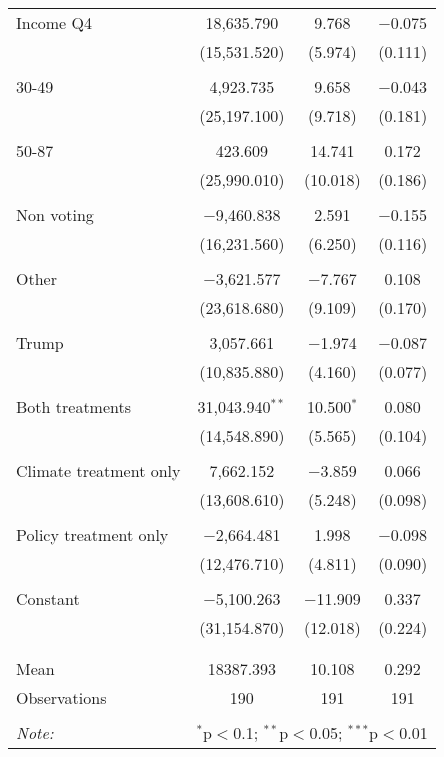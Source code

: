 \begin{tabular}{@{\extracolsep{5pt}}lccc}
 Income Q4 & 18,635.790 & 9.768 & $-$0.075 \\ 
  & (15,531.520) & (5.974) & (0.111) \\ 
  & & & \\ 
 30-49 & 4,923.735 & 9.658 & $-$0.043 \\ 
  & (25,197.100) & (9.718) & (0.181) \\ 
  & & & \\ 
 50-87 & 423.609 & 14.741 & 0.172 \\ 
  & (25,990.010) & (10.018) & (0.186) \\ 
  & & & \\ 
 Non voting & $-$9,460.838 & 2.591 & $-$0.155 \\ 
  & (16,231.560) & (6.250) & (0.116) \\ 
  & & & \\ 
 Other & $-$3,621.577 & $-$7.767 & 0.108 \\ 
  & (23,618.680) & (9.109) & (0.170) \\ 
  & & & \\ 
 Trump & 3,057.661 & $-$1.974 & $-$0.087 \\ 
  & (10,835.880) & (4.160) & (0.077) \\ 
  & & & \\ 
 Both treatments & 31,043.940$^{**}$ & 10.500$^{*}$ & 0.080 \\ 
  & (14,548.890) & (5.565) & (0.104) \\ 
  & & & \\ 
 Climate treatment only & 7,662.152 & $-$3.859 & 0.066 \\ 
  & (13,608.610) & (5.248) & (0.098) \\ 
  & & & \\ 
 Policy treatment only & $-$2,664.481 & 1.998 & $-$0.098 \\ 
  & (12,476.710) & (4.811) & (0.090) \\ 
  & & & \\ 
 Constant & $-$5,100.263 & $-$11.909 & 0.337 \\ 
  & (31,154.870) & (12.018) & (0.224) \\ 
  & & & \\ 
\hline \\[-1.8ex] 
Mean & 18387.393 & 10.108 & 0.292 \\ 
Observations & 190 & 191 & 191 \\ 
\hline 
\hline \\[-1.8ex] 
\textit{Note:}  & \multicolumn{3}{r}{$^{*}$p$<$0.1; $^{**}$p$<$0.05; $^{***}$p$<$0.01} \\ 
\end{tabular} 
